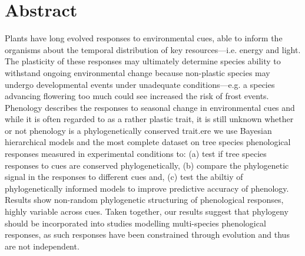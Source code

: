 \documentclass{article}\usepackage[]{graphicx}\usepackage[]{color}
\begin{document}
\section*{Abstract}
\begin{enumerate}

Plants have long evolved responses to environmental cues, able to inform the organisms about the temporal distribution of key resources---i.e. energy and light. The plasticity of these responses may ultimately determine species ability to withstand ongoing environmental change because non-plastic species may undergo developmental events under unadequate conditions---e.g. a species advancing flowering too much could see increased the risk of frost events. Phenology describes the responses to seasonal change in environmental cues and while it is often regarded to as a rather plastic trait, it is still unknown whether or not phenology is a phylogenetically conserved trait.ere we use Bayesian hierarchical models and the most complete dataset on tree species phenological responses measured in experimental conditions to: (a) test if tree species responses to cues are conserved phylogenetically, (b) compare the phylogenetic signal in the responses to different cues and, (c) test the abiltiy of phylogenetically informed models to improve predictive accuracy of phenology. Results show non-random phylogenetic structuring of phenological responses, highly variable across cues.  
Taken together, our results suggest that phylogeny should be incorporated into studies modelling multi-species phenological responses, as such responses have been constrained through evolution and thus are not independent.  


\end{enumerate}
\end{document}
